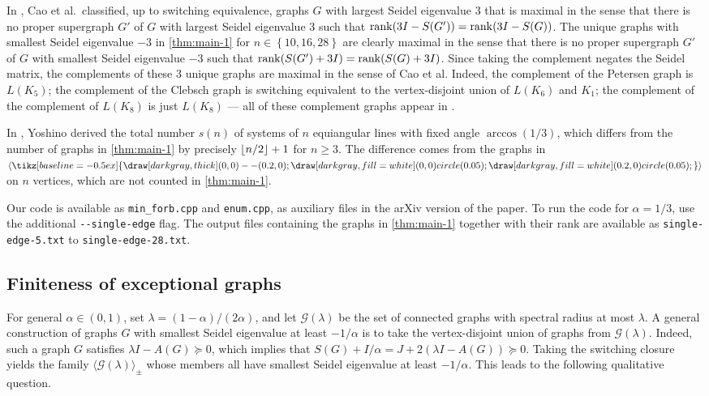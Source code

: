 \documentclass[11pt]{article}
\theoremstyle{definition}
\theoremstyle{remark}
\DeclareMathOperator{\rank}{rank}
\DeclarePairedDelimiter\floor{\lfloor}{\rfloor}
\newcommand{\sset}[1]{\left\{{#1}\right\}}
\newcommand{\G}{\mathcal{G}}
\newcommand{\cl}[1]{\langle #1 \rangle}
\newcommand{\gen}[1]{\langle #1 \rangle_\pm}
\newcommand{\single}{\tikz[baseline=-0.5ex]{\draw[darkgray, thick] (0,0)--(0.2,0); \draw[darkgray, fill=white] (0,0) circle (0.05); \draw[darkgray, fill=white] (0.2,0) circle (0.05);}}
\begin{document}
In \cite{CKMY21}, Cao et al.\ classified, up to switching equivalence, graphs $G$ with largest Seidel eigenvalue $3$ that is maximal in the sense that there is no proper supergraph $G'$ of $G$ with largest Seidel eigenvalue $3$ such that $\rank\mleft(3I - S(G')\mright) = \rank\mleft(3I - S(G)\mright)$. The unique graphs with smallest Seidel eigenvalue $-3$ in \cref{thm:main-1} for $n \in \sset{10, 16, 28}$ are clearly maximal in the sense that there is no proper supergraph $G'$ of $G$ with smallest Seidel eigenvalue $-3$ such that $\rank\mleft(S(G') + 3I\mright) = \rank\mleft(S(G) + 3I\mright)$. Since taking the complement negates the Seidel matrix, the complements of these $3$ unique graphs are maximal in the sense of Cao et al. Indeed, the complement of the Petersen graph is $L(K_5)$; the complement of the Clebsch graph is switching equivalent to the vertex-disjoint union of $L(K_6)$ and $K_1$; the complement of the complement of $L(K_8)$ is just $L(K_8)$ --- all of these complement graphs appear in \cite[Theorem~3.1]{CKMY21}.

In \cite{Y25}, Yoshino derived the total number $s(n)$ of systems of $n$ equiangular lines with fixed angle $\arccos(1/3)$, which differs from the number of graphs in \cref{thm:main-1} by precisely $\floor{n/2} + 1$ for $n \ge 3$. The difference comes from the graphs in $\cl\single$ on $n$ vertices, which are not counted in \cref{thm:main-1}.

Our code is available as \texttt{min\_forb.cpp} and \texttt{enum.cpp}, as auxiliary files in the arXiv version of the paper. To run the code for $\alpha = 1/3$, use the additional \texttt{-{}-single-edge} flag. The output files containing the graphs in \cref{thm:main-1} together with their rank are available as \texttt{single-edge-5.txt} to \texttt{single-edge-28.txt}.

\subsection{Finiteness of exceptional graphs}

For general $\alpha \in (0,1)$, set $\lambda = (1-\alpha)/(2\alpha)$, and let $\G(\lambda)$ be the set of connected graphs with spectral radius at most $\lambda$. A general construction of graphs $G$ with smallest Seidel eigenvalue at least $-1/\alpha$ is to take the vertex-disjoint union of graphs from $\G(\lambda)$. Indeed, such a graph $G$ satisfies $\lambda I - A(G) \succeq 0$, which implies that $S(G) + I/\alpha = J + 2 (\lambda I - A(G)) \succeq 0$. Taking the switching closure yields the family $\gen{\G(\lambda)}$ whose members all have smallest Seidel eigenvalue at least $-1/\alpha$. This leads to the following qualitative question.
\end{document}
